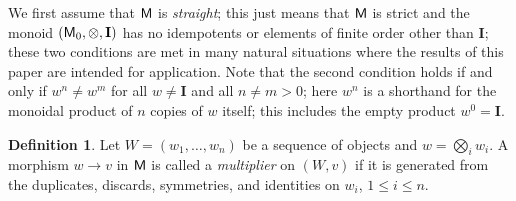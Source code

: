 \documentclass[12pt]{amsart}
\theoremstyle{plain}
\theoremstyle{definition}
\newtheorem{defn}[thm]{Definition}
\theoremstyle{remark}
\numberwithin{equation}{section}
\theoremstyle{plain}
\newcommand{\0}{\emptyset}
\newcommand{\fun}{\longrightarrow}
\newcommand{\cat}[1]{\textup{\textsf{#1}}}
\newcommand{\memph}[1]{{\color{magenta}\emph{#1}}}
\newcommand{\moi}{\mathbf{I}}
\begin{document}
We first assume that $\cat M$ is \memph{straight}; this just means that $\cat M$ is strict and the monoid $(\cat M_0, \otimes, \moi)$ has no idempotents or elements of finite order  other than $\moi$; these two conditions are met in many natural situations where the results of this paper are intended for application.  Note that the second condition holds if and only if $w^n \neq w^m$ for all $w \neq \moi$ and all $n \neq m > 0$; here $w^n$ is a shorthand for  the  monoidal product of $n$ copies of $w$ itself; this includes the empty product $w^0 = \moi$.



\begin{defn}
Let $W = ( w_1, \ldots, w_n )$ be a sequence of objects  and $w = \bigotimes_i w_i$. A morphism $w \fun v$ in $\cat M$ is called a \memph{multiplier} on $(W, v)$  if it is generated from the duplicates, discards, symmetries, and identities on $w_i$, $1 \leq i \leq n$.
\end{defn}
\end{document}
